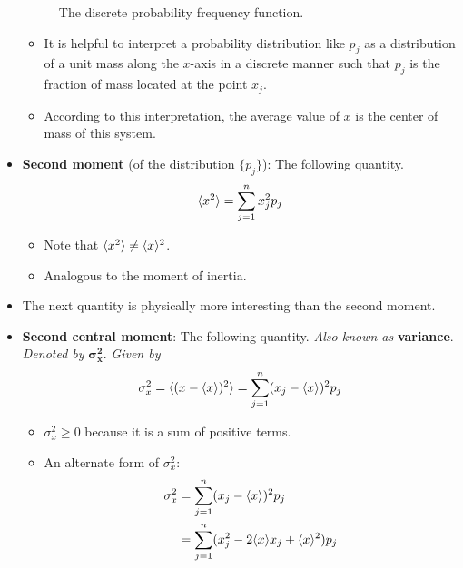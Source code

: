 \documentclass[../notes.tex]{subfiles}
\begin{document}
\begin{itemize}
\begin{figure}[h!]
        \caption{The discrete probability frequency function.}
        \label{fig:discreteProbabilityDensity}
    \end{figure}
    \begin{itemize}
        \item It is helpful to interpret a probability distribution like $p_j$ as a distribution of a unit mass along the $x$-axis in a discrete manner such that $p_j$ is the fraction of mass located at the point $x_j$.
        \item According to this interpretation, the average value of $x$ is the center of mass of this system.
    \end{itemize}
    \pagebreak
    \item \textbf{Second moment} (of the distribution $\{p_j\}$): The following quantity.
    \begin{equation*}
        \langle{x^2}\rangle = \sum_{j=1}^nx_j^2p_j
    \end{equation*}
    \begin{itemize}
        \item Note that $\langle{x^2}\rangle\neq\langle{x}\rangle^2$.
        \item Analogous to the moment of inertia.
    \end{itemize}
    \item The next quantity is physically more interesting than the second moment.
    \item \textbf{Second central moment}: The following quantity. \emph{Also known as} \textbf{variance}. \emph{Denoted by} $\bm{\sigma_x^2}$. \emph{Given by}
    \begin{equation*}
        \sigma_x^2 = \langle{(x-\langle{x}\rangle)^2}\rangle = \sum_{j=1}^n(x_j-\langle{x}\rangle)^2p_j
    \end{equation*}
    \begin{itemize}
        \item $\sigma_x^2\geq 0$ because it is a sum of positive terms.
        \item An alternate form of $\sigma_x^2$:
        \begin{align*}
            \sigma_x^2 &= \sum_{j=1}^n(x_j-\prb{x})^2p_j\\
            &= \sum_{j=1}^n(x_j^2-2\prb{x}x_j+\prb{x}^2)p_j\\

\end{align*}
\end{itemize}
\end{itemize}
\end{document}
